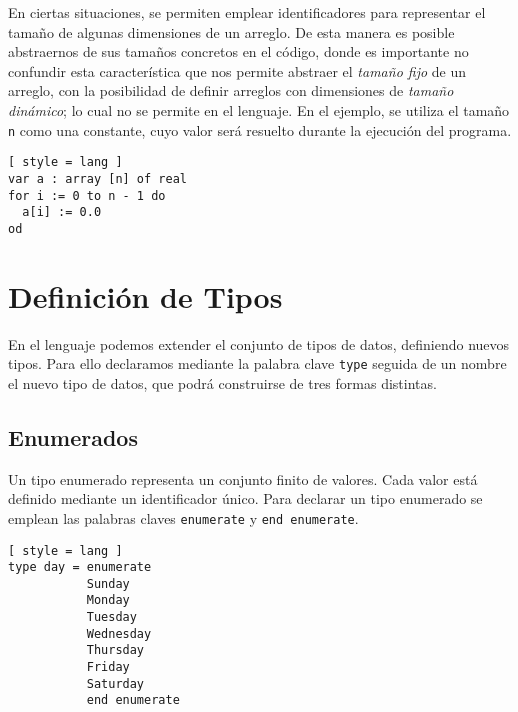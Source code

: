 En ciertas situaciones, se permiten emplear identificadores para representar el tamaño de algunas dimensiones de un arreglo.
De esta manera es posible abstraernos de sus tamaños concretos en el código, donde es importante no confundir esta característica que nos permite abstraer el \textit{tamaño fijo} de un arreglo, con la posibilidad de definir arreglos con dimensiones de \textit{tamaño dinámico}; lo cual no se permite en el lenguaje.
En el ejemplo, se utiliza el tamaño \lstinline[style = lang]{n} como una constante, cuyo valor será resuelto durante la ejecución del programa.

\begin{lstlisting}[ style = lang ]
var a : array [n] of real
for i := 0 to n - 1 do
  a[i] := 0.0
od
\end{lstlisting}




\section{Definición de Tipos}

En el lenguaje podemos extender el conjunto de tipos de datos, definiendo nuevos tipos.
Para ello declaramos mediante la palabra clave \lstinline[style = lang]{type} seguida de un nombre el nuevo tipo de datos, que podrá construirse de tres formas distintas.

\subsection{Enumerados}

Un tipo enumerado representa un conjunto finito de valores.
Cada valor está definido mediante un identificador único.
Para declarar un tipo enumerado se emplean las palabras claves \lstinline[style = lang]{enumerate} y \lstinline[style = lang]{end enumerate}.

\begin{lstlisting}[ style = lang ]
type day = enumerate
           Sunday
           Monday
           Tuesday
           Wednesday
           Thursday
           Friday
           Saturday
           end enumerate
\end{lstlisting}

